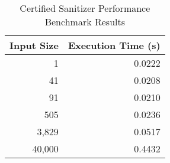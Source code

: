 
\begin{table}[htbp]
\centering
\caption{Certified Sanitizer Performance Benchmark Results}
\label{tab:benchmark_results}
\begin{tabular}{|r|r|}
\hline
\textbf{Input Size} & \textbf{Execution Time (s)} \\
\hline
1 & 0.0222 \\
41 & 0.0208 \\
91 & 0.0210 \\
505 & 0.0236 \\
3,829 & 0.0517 \\
40,000 & 0.4432 \\
\hline
\end{tabular}
\end{table}
